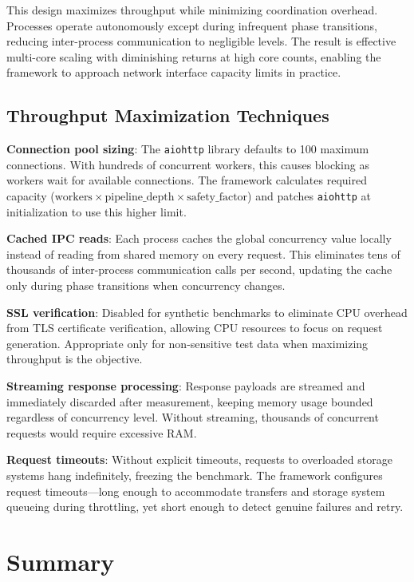 This design maximizes throughput while minimizing coordination overhead. Processes operate autonomously except during infrequent phase transitions, reducing inter-process communication to negligible levels. The result is effective multi-core scaling with diminishing returns at high core counts, enabling the framework to approach network interface capacity limits in practice.

\subsection{Throughput Maximization Techniques}\label{sec:throughput-max}

\textbf{Connection pool sizing}: The \texttt{aiohttp} library defaults to 100 maximum connections. With hundreds of concurrent workers, this causes blocking as workers wait for available connections. The framework calculates required capacity ($\text{workers} \times \text{pipeline\_depth} \times \text{safety\_factor}$) and patches \texttt{aiohttp} at initialization to use this higher limit.

\textbf{Cached IPC reads}: Each process caches the global concurrency value locally instead of reading from shared memory on every request. This eliminates tens of thousands of inter-process communication calls per second, updating the cache only during phase transitions when concurrency changes.

\textbf{SSL verification}: Disabled for synthetic benchmarks to eliminate CPU overhead from TLS certificate verification, allowing CPU resources to focus on request generation. Appropriate only for non-sensitive test data when maximizing throughput is the objective.

\textbf{Streaming response processing}: Response payloads are streamed and immediately discarded after measurement, keeping memory usage bounded regardless of concurrency level. Without streaming, thousands of concurrent requests would require excessive RAM.

\textbf{Request timeouts}: Without explicit timeouts, requests to overloaded storage systems hang indefinitely, freezing the benchmark. The framework configures request timeouts—long enough to accommodate transfers and storage system queueing during throttling, yet short enough to detect genuine failures and retry.

\section{Summary}

